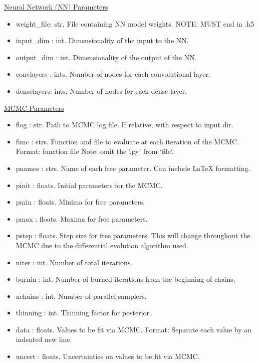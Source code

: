 \documentclass[letterpaper, 12pt]{article}
\begin{document}
\noindent \underline{Neural Network (NN) Parameters}
\begin{itemize}
\item weight\_file: str.  File containing NN model weights.
                   NOTE: MUST end in .h5
\item input\_dim  : int.  Dimensionality of the input  to the NN.
\item output\_dim : int.  Dimensionality of the output of the NN.
\item convlayers : ints. Number of nodes for each convolutional layer.
\item denselayers: ints. Number of nodes for each dense         layer.
\end{itemize}

\noindent \underline{MCMC Parameters}
\begin{itemize}
\item flog        : str.  Path to MCMC log file. 
                          If relative, with respect to input dir.
\item func        : strs. Function and file to evaluate at each iteration of 
                          the MCMC.
                          Format: function file
                          Note: omit the '.py' from `file`.
\item pnames      : strs. Name of each free parameter. Can include LaTeX 
                          formatting.
\item pinit       : floats. Initial parameters for the MCMC.
\item pmin        : floats. Minima for free parameters.
\item pmax        : floats. Maxima for free parameters.
\item pstep       : floats. Step size for free parameters. 
                          This will change throughout the MCMC due to the 
                          differential evolution algorithm used.
\item niter       : int.  Number of total iterations.
\item burnin      : int.  Number of burned iterations from the beginning of 
                          chains.
\item nchains     : int.  Number of parallel samplers.
\item thinning    : int.  Thinning factor for posterior.
\item data        : floats. Values to be fit via MCMC. 
                          Format: Separate each value by an indented new line.
\item uncert      : floats. Uncertainties on values to be fit via MCMC. 

\end{itemize}
\end{document}
